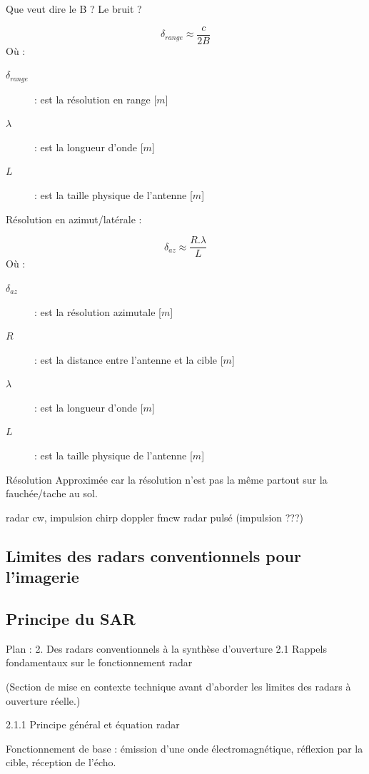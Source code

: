 Que veut dire le B ? Le bruit ? 

\begin{equation}
    \delta_{range} \approx \frac{c}{2B}
\end{equation}
Où :
\begin{description}
    \item[$\delta_{range}$] : est la résolution en range [$m$]
    \item[$\lambda$] : est la longueur d’onde [$m$]
    \item[$L$] : est la taille physique de l'antenne [$m$]
\end{description}

Résolution en azimut/latérale :

\begin{equation}
    \delta_{az} \approx \frac{R. \lambda}{L}
\end{equation}
Où :
\begin{description}
    \item[$\delta_{az}$] : est la résolution azimutale [$m$]
    \item[$R$] : est la distance entre l'antenne et la cible [$m$]
    \item[$\lambda$] : est la longueur d’onde [$m$]
    \item[$L$] : est la taille physique de l'antenne [$m$]
\end{description}

Résolution Approximée car la résolution n'est pas la même partout sur la fauchée/tache au sol.

radar cw,
impulsion
chirp
doppler
fmcw
radar pulsé (impulsion ???)

\subsection{Limites des radars conventionnels pour l'imagerie}

\subsection{Principe du SAR}

Plan : 2. Des radars conventionnels à la synthèse d’ouverture
2.1 Rappels fondamentaux sur le fonctionnement radar

(Section de mise en contexte technique avant d’aborder les limites des radars à ouverture réelle.)

2.1.1 Principe général et équation radar

Fonctionnement de base : émission d’une onde électromagnétique, réflexion par la cible, réception de l’écho.

